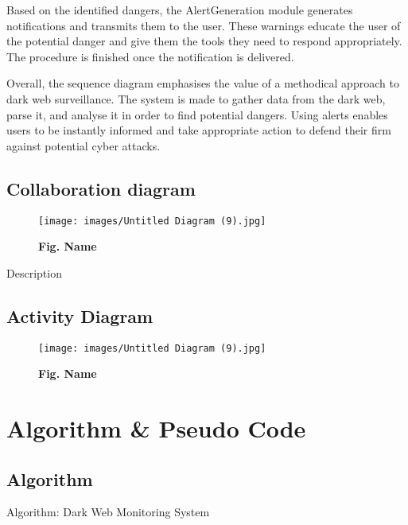 \documentclass[10pt]{report}
\begin{document}
Based on the identified dangers, the AlertGeneration module generates notifications and transmits them to the user. These warnings educate the user of the potential danger and give them the tools they need to respond appropriately. The procedure is finished once the notification is delivered.

Overall, the sequence diagram emphasises the value of a methodical approach to dark web surveillance. The system is made to gather data from the dark web, parse it, and analyse it in order to find potential dangers. Using alerts enables users to be instantly informed and take appropriate action to defend their firm against potential cyber attacks.

\subsection{Collaboration diagram}
\begin{figure}[H]
 \centering
 \texttt{[image: images/Untitled Diagram (9).jpg]}
 \caption{\textbf{Fig. Name}}
\end{figure}
Description

\subsection{Activity Diagram}
\begin{figure}[H]
 \centering
 \texttt{[image: images/Untitled Diagram (9).jpg]}
 \caption{\textbf{Fig. Name}}
\end{figure}
\section{Algorithm \& Pseudo Code}
\subsection{Algorithm}
Algorithm: Dark Web Monitoring System
\end{document}

